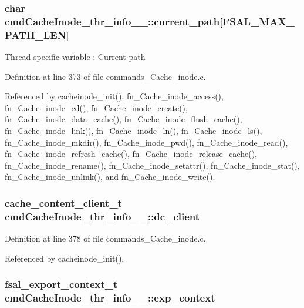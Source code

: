 \subsubsection{\setlength{\rightskip}{0pt plus 5cm}char {\bf cmd\-Cache\-Inode\_\-thr\_\-info\_\-\_\-::current\_\-path}[FSAL\_\-MAX\_\-PATH\_\-LEN]}\label{structcmdCacheInode__thr__info_____o6}


Thread specific variable : Current path 

Definition at line 373 of file commands\_\-Cache\_\-inode.c.

Referenced by cacheinode\_\-init(), fn\_\-Cache\_\-inode\_\-access(), fn\_\-Cache\_\-inode\_\-cd(), fn\_\-Cache\_\-inode\_\-create(), fn\_\-Cache\_\-inode\_\-data\_\-cache(), fn\_\-Cache\_\-inode\_\-flush\_\-cache(), fn\_\-Cache\_\-inode\_\-link(), fn\_\-Cache\_\-inode\_\-ln(), fn\_\-Cache\_\-inode\_\-ls(), fn\_\-Cache\_\-inode\_\-mkdir(), fn\_\-Cache\_\-inode\_\-pwd(), fn\_\-Cache\_\-inode\_\-read(), fn\_\-Cache\_\-inode\_\-refresh\_\-cache(), fn\_\-Cache\_\-inode\_\-release\_\-cache(), fn\_\-Cache\_\-inode\_\-rename(), fn\_\-Cache\_\-inode\_\-setattr(), fn\_\-Cache\_\-inode\_\-stat(), fn\_\-Cache\_\-inode\_\-unlink(), and fn\_\-Cache\_\-inode\_\-write().
\subsubsection{\setlength{\rightskip}{0pt plus 5cm}cache\_\-content\_\-client\_\-t {\bf cmd\-Cache\-Inode\_\-thr\_\-info\_\-\_\-::dc\_\-client}}\label{structcmdCacheInode__thr__info_____o8}




Definition at line 378 of file commands\_\-Cache\_\-inode.c.

Referenced by cacheinode\_\-init().
\subsubsection{\setlength{\rightskip}{0pt plus 5cm}fsal\_\-export\_\-context\_\-t {\bf cmd\-Cache\-Inode\_\-thr\_\-info\_\-\_\-::exp\_\-context}}\label{structcmdCacheInode__thr__info_____o1}




